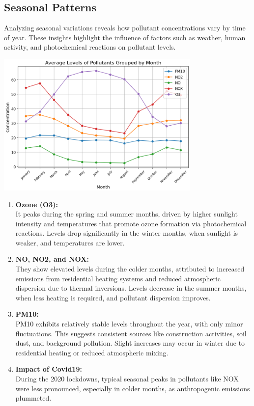 \documentclass{modeleRapport}
\begin{document}
\subsection{Seasonal Patterns}

Analyzing seasonal variations reveals how pollutant concentrations vary by time of year. 
These insights highlight the influence of factors such as weather, human activity, and photochemical 
reactions on pollutant levels.\\

\begin{center}
    \includegraphics[width=10cm]{Images/PollutantsPerMonth.png}
\end{center}

\begin{enumerate}
    \item \textbf{Ozone (O3):}\\
    It peaks during the spring and summer months, driven by higher sunlight intensity and temperatures that promote ozone 
    formation via photochemical reactions. Levels drop significantly in the winter months, when sunlight is weaker, 
    and temperatures are lower.\\
    \item \textbf{NO, NO2, and NOX:}\\
    They show elevated levels during the colder months, attributed to increased emissions from residential heating systems 
    and reduced atmospheric dispersion due to thermal inversions. Levels decrease in the summer months, when less heating 
    is required, and pollutant dispersion improves.\\
    \item \textbf{PM10:}\\
    PM10 exhibits relatively stable levels throughout the year, with only minor fluctuations. This suggests consistent 
    sources like construction activities, soil dust, and background pollution. Slight increases may occur in winter due to 
    residential heating or reduced atmospheric mixing.\\
    \item \textbf{Impact of Covid19:}\\
    During the 2020 lockdowns, typical seasonal peaks in pollutants like NOX were less pronounced, 
    especially in colder months, as anthropogenic emissions plummeted.\\
\end{enumerate}
\end{document}
